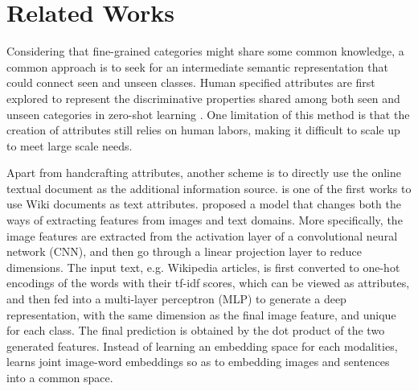 \documentclass{article}
\begin{document}


\section{Related Works}    
Considering that fine-grained categories might share some common knowledge, a common approach is to seek for an intermediate semantic representation that could connect seen and unseen classes. Human specified attributes are first explored to represent the discriminative properties shared among both seen and unseen categories in zero-shot learning \cite{torresani2010efficient, lampert2009learning}. One limitation of this method is that the creation of attributes still relies on human labors, making it difficult to scale up to meet large scale needs. \par 


Apart from handcrafting attributes, another scheme is to directly use the online textual document as the additional information source. \cite{Elhoseiny2013} is one of the first works to use Wiki documents as text attributes. \cite{Ba_2015_ICCV} proposed a model that changes both the ways of extracting features from images and text domains. More specifically, the image features are extracted from the activation layer of a convolutional neural network (CNN), and then go through a linear projection layer to reduce dimensions. The input text, e.g. Wikipedia articles, is first converted to one-hot encodings of the words with their tf-idf scores, which can be viewed as attributes, and then fed into a multi-layer perceptron (MLP) to generate a deep representation, with the same dimension as the final image feature, and unique for each class. The final prediction is obtained by the dot product of the two generated features. Instead of learning an embedding space for each modalities, \cite{frome2013devise} learns joint image-word embeddings so as to embedding images and sentences into a common space.\\
	
\end{document}
